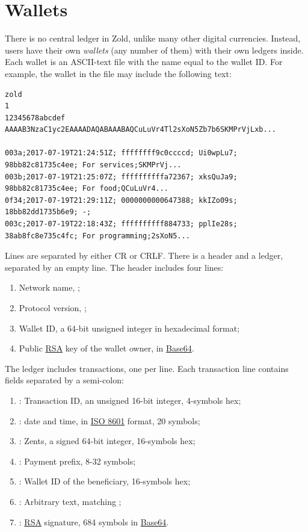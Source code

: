 \documentclass{main}
\begin{document}
\section{Wallets}\label{sec:wallets}

There is no central ledger in Zold, unlike many other digital currencies.
Instead, users have their own \emph{wallets} (any number of them) with their own ledgers inside.
Each wallet is an ASCII-text file with the name equal to the wallet ID.
For example, the wallet in the file  may include
the following text:

\begin{verbatim}
zold
1
12345678abcdef
AAAAB3NzaC1yc2EAAAADAQABAAABAQCuLuVr4Tl2sXoN5Zb7b6SKMPrVjLxb...

003a;2017-07-19T21:24:51Z; ffffffff9c0ccccd; Ui0wpLu7; 98bb82c81735c4ee; For services;SKMPrVj...
003b;2017-07-19T21:25:07Z; ffffffffffa72367; xksQuJa9; 98bb82c81735c4ee; For food;QCuLuVr4...
0f34;2017-07-19T21:29:11Z; 0000000000647388; kkIZo09s; 18bb82dd1735b6e9; -;
003c;2017-07-19T22:18:43Z; ffffffffff884733; pplIe28s; 38ab8fc8e735c4fc; For programming;2sXoN5...
\end{verbatim}

Lines are separated by either CR or CRLF.
There is a header and a ledger, separated by an empty line.
The header includes four lines:

\begin{enumerate}
  \item Network name, ;
  \item Protocol version, \dd{[0-9]+};
  \item Wallet ID, a 64-bit unsigned integer in hexadecimal format;
  \item Public \href{https://en.wikipedia.org/wiki/RSA_(cryptosystem)}{RSA}
    key of the wallet owner, in \href{https://en.wikipedia.org/wiki/Base64}{Base64}.
\end{enumerate}

The ledger includes transactions, one per line. Each transaction line
contains fields separated by a semi-colon:

\begin{enumerate}
  \item {}: Transaction ID, an unsigned 16-bit integer, 4-symbols hex;
  \item {}: date and time, in \href{https://en.wikipedia.org/wiki/ISO_8601}{ISO 8601} format, 20 symbols;
  \item {}: Zents, a signed 64-bit integer, 16-symbols hex;
  \item {}: Payment prefix, 8-32 symbols;
  \item {}: Wallet ID of the beneficiary, 16-symbols hex;
  \item {}: Arbitrary text, matching ;
  \item {}: \href{https://en.wikipedia.org/wiki/RSA_(cryptosystem)}{RSA} signature,
    684 symbols in \href{https://en.wikipedia.org/wiki/Base64}{Base64}.
\end{enumerate}
\end{document}
